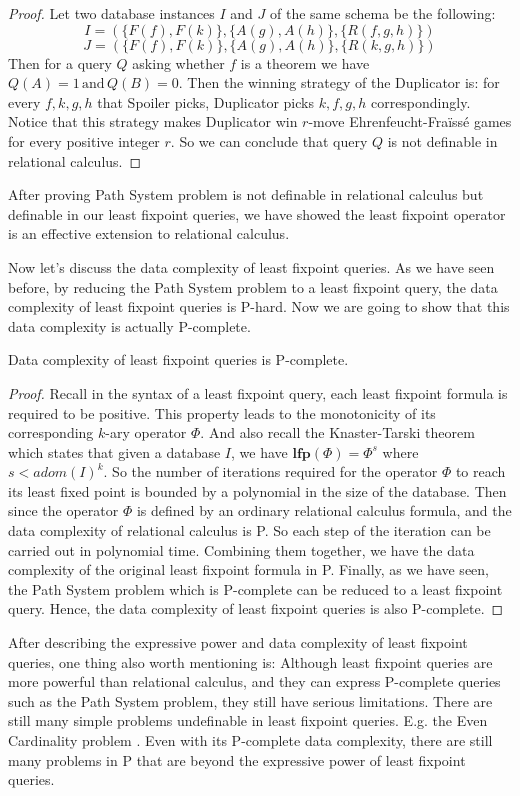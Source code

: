 \begin{proof}
Let two database instances $I$ and $J$ of the same schema be the following:
$$I=(\{F(f), F(k)\}, \{A(g),A(h)\},\{R(f,g,h)\})$$
$$J=(\{F(f), F(k)\}, \{A(g),A(h)\}, \{R(k,g,h)\})$$
Then for a query $Q$ asking whether $f$ is a theorem we have $Q(A)=1 \, \text{and} \, Q(B)=0$. Then the winning strategy of the Duplicator is: for every $f,k,g,h$ that Spoiler picks, Duplicator picks $k,f,g,h$ correspondingly. Notice that this strategy makes Duplicator win $r$-move Ehrenfeucht-Fra\"iss\'e games for every positive integer $r$. So we can conclude that query $Q$ is not definable in relational calculus.
\end{proof}

After proving Path System problem is not definable in relational calculus but definable in our least fixpoint queries, we have showed the least fixpoint operator is an effective extension to relational calculus.

Now let's discuss the data complexity of least fixpoint queries. As we have seen before, by reducing the Path System problem to a least fixpoint query, the data complexity of least fixpoint queries is P-hard. Now we are going to show  that this data complexity is actually P-complete.

\begin{claim}
Data complexity of least fixpoint queries is P-complete.
\end{claim}
\begin{proof}
Recall in the syntax of a least fixpoint query, each least fixpoint formula is required to be positive. This property leads to the monotonicity of its corresponding $k$-ary operator $\Phi$. And also recall the Knaster-Tarski theorem which states that given a database $I$, we have $\textbf{lfp}(\Phi)=\Phi^s$ where $s<adom(I)^k$. So the number of iterations required for the operator $\Phi$ to reach its least fixed point is bounded by a polynomial in the size of the database. Then since the operator $\Phi$ is defined by an ordinary relational calculus formula, and the data complexity of relational calculus is P. So each step of the iteration can be carried out in polynomial time. Combining them together, we have the data complexity of the original least fixpoint formula in P. Finally, as we have seen, the Path System problem which is P-complete can be reduced to a least fixpoint query. Hence, the data complexity of least fixpoint queries is also P-complete. 
\end{proof}

After describing the expressive power and data complexity of least fixpoint queries, one thing also worth mentioning is: Although least fixpoint queries are more powerful than relational calculus, and they can express P-complete queries such as the Path System problem, they still have serious limitations. There are still many simple problems undefinable in least fixpoint queries. E.g. the Even Cardinality problem \cite{kolaitis1}. Even with its P-complete data complexity, there are still many problems in P that are beyond the expressive power of least fixpoint queries.



